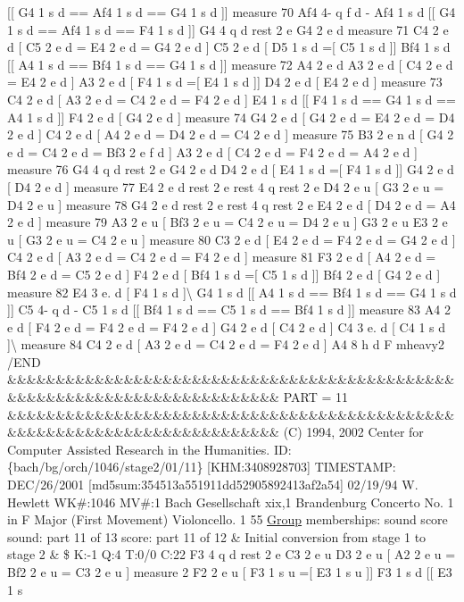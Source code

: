 \mbox{[}\mbox{[} G4 1 s d == Af4 1 s d == G4 1 s d \mbox{]}\mbox{]} measure 70 Af4 4-\/ q f d -\/ Af4 1 s d \mbox{[}\mbox{[} G4 1 s d == Af4 1 s d == F4 1 s d \mbox{]}\mbox{]} G4 4 q d rest 2 e G4 2 e d measure 71 C4 2 e d \mbox{[} C5 2 e d = E4 2 e d = G4 2 e d \mbox{]} C5 2 e d \mbox{[} D5 1 s d =\mbox{[} C5 1 s d \mbox{]}\mbox{]} Bf4 1 s d \mbox{[}\mbox{[} A4 1 s d == Bf4 1 s d == G4 1 s d \mbox{]}\mbox{]} measure 72 A4 2 e d A3 2 e d \mbox{[} C4 2 e d = E4 2 e d \mbox{]} A3 2 e d \mbox{[} F4 1 s d =\mbox{[} E4 1 s d \mbox{]}\mbox{]} D4 2 e d \mbox{[} E4 2 e d \mbox{]} measure 73 C4 2 e d \mbox{[} A3 2 e d = C4 2 e d = F4 2 e d \mbox{]} E4 1 s d \mbox{[}\mbox{[} F4 1 s d == G4 1 s d == A4 1 s d \mbox{]}\mbox{]} F4 2 e d \mbox{[} G4 2 e d \mbox{]} measure 74 G4 2 e d \mbox{[} G4 2 e d = E4 2 e d = D4 2 e d \mbox{]} C4 2 e d \mbox{[} A4 2 e d = D4 2 e d = C4 2 e d \mbox{]} measure 75 B3 2 e n d \mbox{[} G4 2 e d = C4 2 e d = Bf3 2 e f d \mbox{]} A3 2 e d \mbox{[} C4 2 e d = F4 2 e d = A4 2 e d \mbox{]} measure 76 G4 4 q d rest 2 e G4 2 e d D4 2 e d \mbox{[} E4 1 s d =\mbox{[} F4 1 s d \mbox{]}\mbox{]} G4 2 e d \mbox{[} D4 2 e d \mbox{]} measure 77 E4 2 e d rest 2 e rest 4 q rest 2 e D4 2 e u \mbox{[} G3 2 e u = D4 2 e u \mbox{]} measure 78 G4 2 e d rest 2 e rest 4 q rest 2 e E4 2 e d \mbox{[} D4 2 e d = A4 2 e d \mbox{]} measure 79 A3 2 e u \mbox{[} Bf3 2 e u = C4 2 e u = D4 2 e u \mbox{]} G3 2 e u E3 2 e u \mbox{[} G3 2 e u = C4 2 e u \mbox{]} measure 80 C3 2 e d \mbox{[} E4 2 e d = F4 2 e d = G4 2 e d \mbox{]} C4 2 e d \mbox{[} A3 2 e d = C4 2 e d = F4 2 e d \mbox{]} measure 81 F3 2 e d \mbox{[} A4 2 e d = Bf4 2 e d = C5 2 e d \mbox{]} F4 2 e d \mbox{[} Bf4 1 s d =\mbox{[} C5 1 s d \mbox{]}\mbox{]} Bf4 2 e d \mbox{[} G4 2 e d \mbox{]} measure 82 E4 3 e. d \mbox{[} F4 1 s d \mbox{]}\textbackslash{} G4 1 s d \mbox{[}\mbox{[} A4 1 s d == Bf4 1 s d == G4 1 s d \mbox{]}\mbox{]} C5 4-\/ q d -\/ C5 1 s d \mbox{[}\mbox{[} Bf4 1 s d == C5 1 s d == Bf4 1 s d \mbox{]}\mbox{]} measure 83 A4 2 e d \mbox{[} F4 2 e d = F4 2 e d = F4 2 e d \mbox{]} G4 2 e d \mbox{[} C4 2 e d \mbox{]} C4 3 e. d \mbox{[} C4 1 s d \mbox{]}\textbackslash{} measure 84 C4 2 e d \mbox{[} A3 2 e d = C4 2 e d = F4 2 e d \mbox{]} A4 8 h d F mheavy2 /\+E\+ND \&\&\&\&\&\&\&\&\&\&\&\&\&\&\&\&\&\&\&\&\&\&\&\&\&\&\&\&\&\&\&\&\&\&\&\&\&\&\&\&\&\&\&\&\&\&\&\&\&\&\&\&\&\&\&\&\&\&\&\&\&\&\&\&\&\&\&\&\&\&\&\&\&\& P\+A\+RT = 11 \&\&\&\&\&\&\&\&\&\&\&\&\&\&\&\&\&\&\&\&\&\&\&\&\&\&\&\&\&\&\&\&\&\&\&\&\&\&\&\&\&\&\&\&\&\&\&\&\&\&\&\&\&\&\&\&\&\&\&\&\&\&\&\&\&\&\&\&\&\&\&\&\&\& (C) 1994, 2002 Center for Computer Assisted Research in the Humanities. ID\+: \{bach/bg/orch/1046/stage2/01/11\} \mbox{[}K\+HM\+:3408928703\mbox{]} T\+I\+M\+E\+S\+T\+A\+MP\+: D\+E\+C/26/2001 \mbox{[}md5sum\+:354513a551911dd52905892413af2a54\mbox{]} 02/19/94 W. Hewlett WK\#\+:1046 MV\#\+:1 Bach Gesellschaft xix,1 Brandenburg Concerto No. 1 in F Major (First Movement) Violoncello. 1 55 \hyperlink{class_group}{Group} memberships\+: sound score sound\+: part 11 of 13 score\+: part 11 of 12 \& Initial conversion from stage 1 to stage 2 \& \$ K\+:-\/1 Q\+:4 T\+:0/0 C\+:22 F3 4 q d rest 2 e C3 2 e u D3 2 e u \mbox{[} A2 2 e u = Bf2 2 e u = C3 2 e u \mbox{]} measure 2 F2 2 e u \mbox{[} F3 1 s u =\mbox{[} E3 1 s u \mbox{]}\mbox{]} F3 1 s d \mbox{[}\mbox{[} E3 1 s 